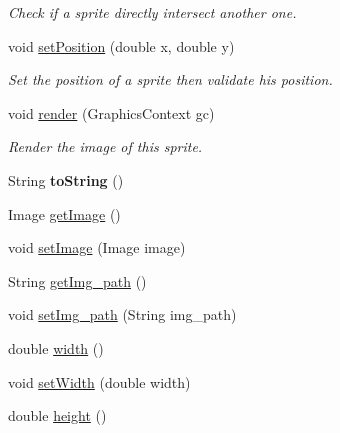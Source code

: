 \begin{DoxyCompactItemize}
\begin{DoxyCompactList}\small\item\em Check if a sprite directly intersect another one. \end{DoxyCompactList}\item 
void \mbox{\hyperlink{classfr_1_1groupe40_1_1projet_1_1model_1_1_sprite_a12305126f539c9403a9bb03a861aa9c0}{set\+Position}} (double x, double y)
\begin{DoxyCompactList}\small\item\em Set the position of a sprite then validate his position. \end{DoxyCompactList}\item 
void \mbox{\hyperlink{classfr_1_1groupe40_1_1projet_1_1model_1_1_sprite_adaa6c20253be22213e199b90d709f275}{render}} (Graphics\+Context gc)
\begin{DoxyCompactList}\small\item\em Render the image of this sprite. \end{DoxyCompactList}\item 
\mbox{\label{classfr_1_1groupe40_1_1projet_1_1model_1_1_sprite_a171e3b2a9d38864f6f4a5fef3e8efe49}} 
String {\bfseries to\+String} ()
\item 
Image \mbox{\hyperlink{classfr_1_1groupe40_1_1projet_1_1model_1_1_sprite_ae978c58649b232749722a2c2c86e1f0d}{get\+Image}} ()
\item 
void \mbox{\hyperlink{classfr_1_1groupe40_1_1projet_1_1model_1_1_sprite_a79c8fe34e9f81804079ca381b589f6e3}{set\+Image}} (Image image)
\item 
String \mbox{\hyperlink{classfr_1_1groupe40_1_1projet_1_1model_1_1_sprite_a208906f75c02531120b4d0c78c59e7f9}{get\+Img\+\_\+path}} ()
\item 
void \mbox{\hyperlink{classfr_1_1groupe40_1_1projet_1_1model_1_1_sprite_a6d246968ec03152ee63d12696c6cd9a4}{set\+Img\+\_\+path}} (String img\+\_\+path)
\item 
double \mbox{\hyperlink{classfr_1_1groupe40_1_1projet_1_1model_1_1_sprite_a9c9d69c95176ab9663f7b2beb64d6a2d}{width}} ()
\item 
void \mbox{\hyperlink{classfr_1_1groupe40_1_1projet_1_1model_1_1_sprite_a600096893822f1625075033719653eb9}{set\+Width}} (double width)
\item 
double \mbox{\hyperlink{classfr_1_1groupe40_1_1projet_1_1model_1_1_sprite_aabcca84219036d2102c9308fbb7ed178}{height}} ()
\item 

\end{DoxyCompactItemize}
